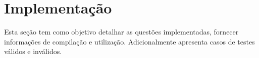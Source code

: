   \chapter[Implementação]{Implementação}

  Esta seção tem como objetivo detalhar as questões implementadas, fornecer informações de compilação e utilização. Adicionalmente apresenta casos de testes válidos e inválidos.




